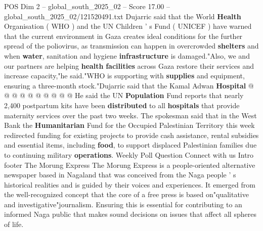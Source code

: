 \begin{textsample}{POS Dim 2 – global\_south\_2025\_02 – Score 17.00 – global\_south\_2025\_02/121520491.txt}
Dujarric said that the World \textbf{Health} Organisation ( WHO ) and the UN Children ' s Fund ( UNICEF ) have warned that the current environment in Gaza creates ideal conditions for the further spread of the poliovirus, as transmission can happen in overcrowded \textbf{shelters} and when \textbf{water}, sanitation and hygiene \textbf{infrastructure} is damaged."Also, we and our partners are helping \textbf{health} \textbf{facilities} across Gaza restore their services and increase capacity,"he said."WHO is supporting with \textbf{supplies} and equipment, ensuring a three-month stock."Dujarric said that the Kamal Adwan \textbf{Hospital} @ @ @ @ @ @ @ @ @ @ He said the UN \textbf{Population} Fund reports that nearly 2,400 postpartum kits have been \textbf{distributed} to all \textbf{hospitals} that provide maternity services over the past two weeks.
The spokesman said that in the West Bank the \textbf{Humanitarian} Fund for the Occupied Palestinian Territory this week redirected funding for existing projects to provide cash assistance, rental subsidies and essential items, including \textbf{food}, to support displaced Palestinian families due to continuing military \textbf{operations}.
Weekly Poll Question Connect with us Intro footer The Morung Express The Morung Express is a people-oriented alternative newspaper based in Nagaland that was conceived from the Naga people ' s historical realities and is guided by their voices and experiences.
It emerged from the well-recognized concept that the core of a free press is based on"qualitative and investigative"journalism.
Ensuring this is essential for contributing to an informed Naga public that makes sound decisions on issues that affect all spheres of life.

\end{textsample}

